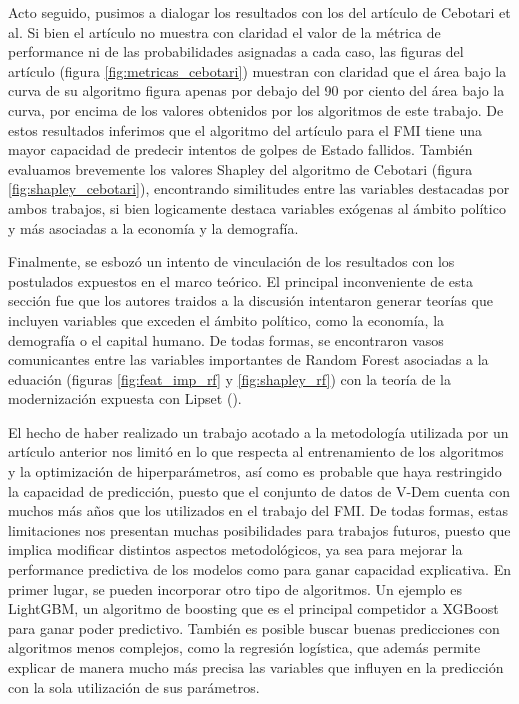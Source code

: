 \documentclass{article}
\begin{document}
Acto seguido, pusimos a dialogar los resultados con los del artículo de Cebotari et al. Si bien el artículo
no muestra con claridad el valor de la métrica de performance ni de las probabilidades asignadas a cada caso,
las figuras del artículo (figura \ref{fig:metricas_cebotari}) muestran con claridad que el área bajo la curva
de su algoritmo figura apenas por debajo del 90 por ciento del área bajo la curva, por encima de los
valores obtenidos por los algoritmos de este trabajo. De estos resultados inferimos que el algoritmo del 
artículo para el FMI tiene una mayor capacidad de predecir intentos de golpes de Estado fallidos. También
evaluamos brevemente los valores Shapley del algoritmo de Cebotari (figura \ref{fig:shapley_cebotari}), 
encontrando similitudes entre las variables destacadas por ambos trabajos, si bien logicamente destaca 
variables exógenas al ámbito político y más asociadas a la economía y la demografía.

Finalmente, se esbozó un intento de vinculación de los resultados con los postulados expuestos en el marco
teórico. El principal inconveniente de esta sección fue que los autores traidos a la discusión intentaron
generar teorías que incluyen variables que exceden el ámbito político, como la economía,
la demografía o el capital humano. De todas formas, se encontraron vasos comunicantes entre las variables
importantes de Random Forest asociadas a la eduación (figuras \ref{fig:feat_imp_rf} y \ref{fig:shapley_rf})
con la teoría de la modernización expuesta con Lipset (\citeyear{lipset1959some}).

El hecho de haber realizado un trabajo acotado a la metodología utilizada por un artículo anterior
nos limitó en lo que respecta al entrenamiento de los algoritmos y la optimización
de hiperparámetros, así como es probable que haya restringido la capacidad de predicción, puesto que el 
conjunto de datos de V-Dem cuenta con muchos más años que los utilizados en 
el trabajo del FMI. De todas formas, estas limitaciones nos presentan muchas posibilidades para trabajos 
futuros, puesto que implica modificar distintos aspectos 
metodológicos, ya sea para mejorar la performance predictiva de los modelos como para ganar capacidad
explicativa. En primer lugar, se pueden incorporar otro tipo de algoritmos. Un ejemplo es LightGBM, un 
algoritmo de boosting que es el principal competidor a XGBoost para ganar poder predictivo. También es 
posible buscar buenas predicciones con algoritmos menos complejos, como la regresión logística, que además 
permite explicar de manera mucho más precisa las variables que influyen en la predicción con la sola 
utilización de sus parámetros.
\end{document}
